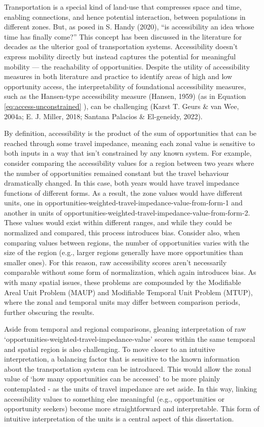 \documentclass[
11pt, %
oneside, %
english, %
singlespacing, %
]{macthesis} %
\begin{document}
Transportation is a special kind of land-use that compresses space and time, enabling connections, and hence potential interaction, between populations in different zones. But, as posed in S. Handy (2020), ``is accessibility an idea whose time has finally come?'' This concept has been discussed in the literature for decades as the ulterior goal of transportation systems. Accessibility doesn't express mobility directly but instead captures the potential for meaningful mobility --- the reachability of opportunities. Despite the utility of accessibility measures in both literature and practice to identify areas of high and low opportunity access, the interpretability of foundational accessibility measures, such as the Hansen-type accessibility measure (Hansen, 1959) (as in Equation \ref{eq:access-unconstrained} ), can be challenging (Karst T. Geurs \& van Wee, 2004a; E. J. Miller, 2018; Santana Palacios \& El-geneidy, 2022).

By definition, accessibility is the product of the sum of opportunities that can be reached through some travel impedance, meaning each zonal value is sensitive to both inputs in a way that isn't constrained by any known system. For example, consider comparing the accessibility values for a region between two years where the number of opportunities remained constant but the travel behaviour dramatically changed. In this case, both years would have travel impedance functions of different forms. As a result, the zone values would have different units, one in opportunities-weighted-travel-impedance-value-from-form-1 and another in units of opportunities-weighted-travel-impedance-value-from-form-2. These values would exist within different ranges, and while they could be normalized and compared, this process introduces bias. Consider also, when comparing values between regions, the number of opportunities varies with the size of the region (e.g., larger regions generally have more opportunities than smaller ones). For this reason, raw accessibility scores aren't necessarily comparable without some form of normalization, which again introduces bias. As with many spatial issues, these problems are compounded by the Modifiable Areal Unit Problem (MAUP) and Modifiable Temporal Unit Problem (MTUP), where the zonal and temporal units may differ between comparison periods, further obscuring the results.

Aside from temporal and regional comparisons, gleaning interpretation of raw `opportunities-weighted-travel-impedance-value' scores within the same temporal and spatial region is also challenging. To move closer to an intuitive interpretation, a balancing factor that is sensitive to the known information about the transportation system can be introduced. This would allow the zonal value of `how many opportunities can be accessed' to be more plainly contemplated - as the units of travel impedance are set aside. In this way, linking accessibility values to something else meaningful (e.g., opportunities or opportunity seekers) become more straightforward and interpretable. This form of intuitive interpretation of the units is a central aspect of this dissertation.
\end{document}
